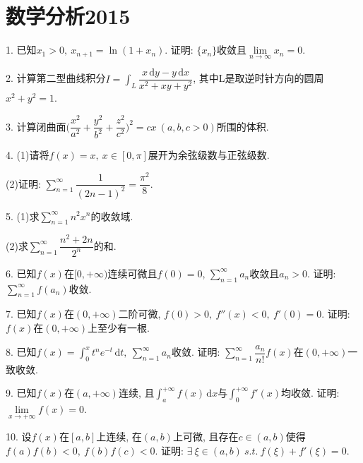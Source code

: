 \documentclass[12pt, a4paper, twoside]{ctexart}%
\newcommand{\rmd}{\mathrm{d}} %
\begin{document}
	\section{数学分析2015}
	1. 已知$x_1>0,\ x_{n+1}=\ln (1+x_n)$. 证明: $\{x_n\}$收敛且$\lim\limits_{n\rightarrow\infty}x_n=0$.\par 
	2. 计算第二型曲线积分$I=\int_L\dfrac{x\,\rmd y-y\,\rmd x}{x^2+xy+y^2}$, 其中L是取逆时针方向的圆周$x^2+y^2=1$.\par 
	3. 计算闭曲面$\Big(\dfrac{x^2}{a^2}+\dfrac{y^2}{b^2}+\dfrac{z^2}{c^2}\Big)^2=cx\ (a,b,c>0)$所围的体积.\par
	4. (1)请将$f(x)=x,\ x\in[0,\pi]$展开为余弦级数与正弦级数. \par
	\hspace{1.2em}(2)证明: $\sum\limits_{n=1}^\infty\dfrac{1}{(2n-1)^2}=\dfrac{\pi^2}{8}$.\par 
	5. (1)求$\sum\limits_{n=1}^\infty n^2 x^n$的收敛域.\par
	\hspace{1.2em}(2)求$\sum\limits_{n=1}^\infty\dfrac{n^2+2n}{2^n}$的和.\par
	6. 已知$f(x)\mbox{在}[0,+\infty)$连续可微且$f(0)=0$, $\sum\limits_{n=1}^{\infty}a_n$收敛且$a_n>0$. 证明: $\sum\limits_{n=1}^{\infty}f(a_n)$收敛.\par
	7. 已知$f(x)\mbox{在}(0,+\infty)$二阶可微, $f(0)>0,\ f''(x)<0,\ f'(0)=0$. 证明: $ f(x)\mbox{在}(0,+\infty)$上至少有一根.\par
	8. 已知$f(x)=\int_0^x t^n e^{-t}\,\rmd t,\ \sum\limits_{n=1}^\infty a_n$收敛. 证明: $\sum\limits_{n=1}^\infty\dfrac{a_n}{n!}f(x)\mbox{在}(0,+\infty)$一致收敛. \par
	9. 已知$f(x)\mbox{在}(a,+\infty)$连续, 且$\int_a^{+\infty}f(x)\,\rmd x\mbox{与}\int_0^{+\infty}f'(x)$均收敛. 证明: $\lim\limits_{x\rightarrow+\infty}f(x)=0$.\par 
	10. 设$f(x)\mbox{在}[a,b]$上连续, 在$(a,b)$上可微, 且存在$c\in(a,b)$使得$f(a)f(b)<0,\ f(b)f(c)<0$. 证明: $\exists\ \xi\in(a,b)\ s.t.\ f(\xi)+f'(\xi)=0$.\par 
	
	\clearpage
\end{document}
